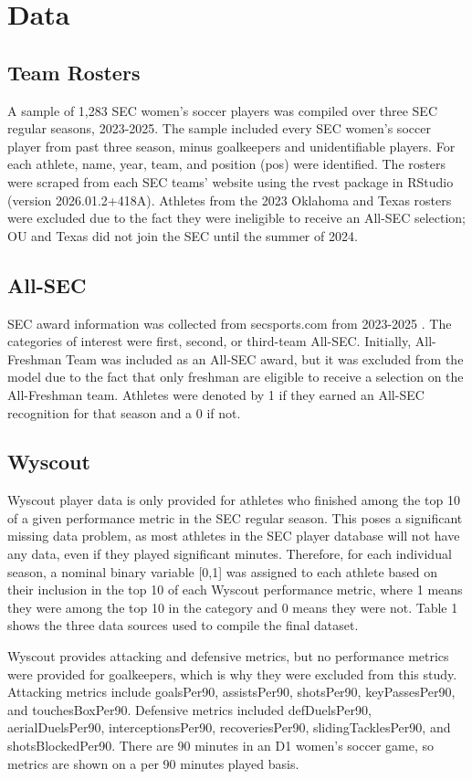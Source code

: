 \documentclass{article}
\begin{document}
\section{Data}
\subsection{Team Rosters}
A sample of 1,283 SEC women’s soccer players was compiled over three SEC regular seasons, 2023-2025. The sample included every SEC women’s soccer player from past three season, minus goalkeepers and unidentifiable players. For each athlete, name, year, team, and position (pos) were identified. The rosters were scraped from each SEC teams’ website using the rvest package in RStudio (version 2026.01.2+418A). Athletes from the 2023 Oklahoma and Texas rosters were excluded due to the fact they were ineligible to receive an All-SEC selection; OU and Texas did not join the SEC until the summer of 2024. 

\subsection{All-SEC}
SEC award information was collected from secsports.com from 2023-2025 \cite{sec2023,sec2024,sec2025}. The categories of interest were first, second, or third-team All-SEC. Initially, All-Freshman Team was included as an All-SEC award, but it was excluded from the model due to the fact that only freshman are eligible to receive a selection on the All-Freshman team. Athletes were denoted by 1 if they earned an All-SEC recognition for that season and a 0 if not.

\subsection{Wyscout}
Wyscout player data is only provided for athletes who finished among the top 10 of a given performance metric in the SEC regular season. This poses a significant missing data problem, as most athletes in the SEC player database will not have any data, even if they played significant minutes. Therefore, for each individual season, a nominal binary variable [0,1] was assigned to each athlete based on their inclusion in the top 10 of each Wyscout performance metric, where 1 means they were among the top 10 in the category and 0 means they were not. Table 1 shows the three data sources used to compile the final dataset.

Wyscout provides attacking and defensive metrics, but no performance metrics were provided for goalkeepers, which is why they were excluded from this study. Attacking metrics include goalsPer90, assistsPer90, shotsPer90, keyPassesPer90, and touchesBoxPer90. Defensive metrics included defDuelsPer90, aerialDuelsPer90, interceptionsPer90, recoveriesPer90, slidingTacklesPer90, and shotsBlockedPer90. There are 90 minutes in an D1 women’s soccer game, so metrics are shown on a per 90 minutes played basis.
\end{document}
